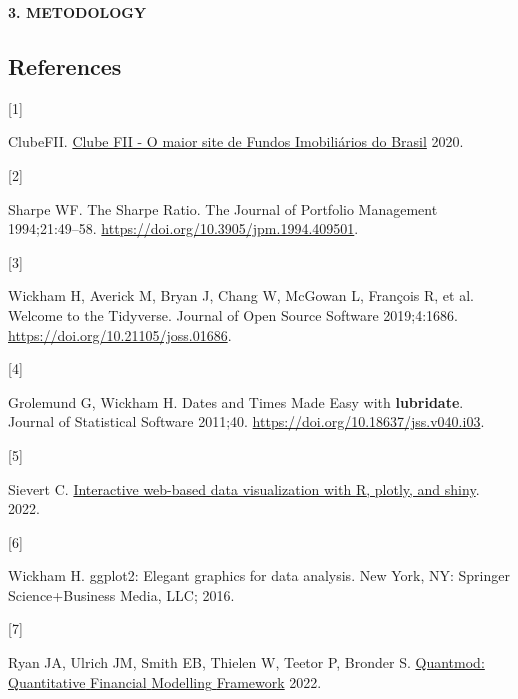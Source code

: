 \documentclass[
]{article}
\newlength{\cslhangindent}
\newlength{\csllabelwidth}
\newlength{\cslentryspacingunit} %
\newenvironment{CSLReferences}[2] %
 {%
  \setlength{\parindent}{0pt}
  \ifodd #1
  \let\oldpar\par
  \def\par{\hangindent=\cslhangindent\oldpar}
  \fi
  \setlength{\parskip}{#2\cslentryspacingunit}
 }%
 {}
\newcommand{\CSLLeftMargin}[1]{\parbox[t]{\csllabelwidth}{#1}}
\newcommand{\CSLRightInline}[1]{\parbox[t]{\linewidth - \csllabelwidth}{#1}\break}
\begin{document}
\begin{center}
\textbf{3. METODOLOGY}
\end{center}

\hypertarget{references}{%
\subsection*{References}\label{references}}

\hypertarget{refs}{}
\begin{CSLReferences}{0}{0}
\leavevmode{}%
\CSLLeftMargin{{[}1{]} }%
\CSLRightInline{ClubeFII. \href{https://www.clubefii.com.br}{Clube FII -
O maior site de Fundos Imobiliários do Brasil} 2020.}

\leavevmode{}%
\CSLLeftMargin{{[}2{]} }%
\CSLRightInline{Sharpe WF. The Sharpe Ratio. The Journal of Portfolio
Management 1994;21:49--58.
\url{https://doi.org/10.3905/jpm.1994.409501}.}

\leavevmode{}%
\CSLLeftMargin{{[}3{]} }%
\CSLRightInline{Wickham H, Averick M, Bryan J, Chang W, McGowan L,
François R, et al. Welcome to the {Tidyverse}. Journal of Open Source
Software 2019;4:1686. \url{https://doi.org/10.21105/joss.01686}.}

\leavevmode{}%
\CSLLeftMargin{{[}4{]} }%
\CSLRightInline{Grolemund G, Wickham H. Dates and {Times} {Made} {Easy}
with \textbf{lubridate}. Journal of Statistical Software 2011;40.
\url{https://doi.org/10.18637/jss.v040.i03}.}

\leavevmode{}%
\CSLLeftMargin{{[}5{]} }%
\CSLRightInline{Sievert C. \href{https://plotly-r.com/}{Interactive
web-based data visualization with {R}, plotly, and shiny}. 2022.}

\leavevmode{}%
\CSLLeftMargin{{[}6{]} }%
\CSLRightInline{Wickham H. ggplot2: Elegant graphics for data analysis.
New York, NY: Springer Science+Business Media, LLC; 2016.}

\leavevmode{}%
\CSLLeftMargin{{[}7{]} }%
\CSLRightInline{Ryan JA, Ulrich JM, Smith EB, Thielen W, Teetor P,
Bronder S. \href{https://CRAN.R-project.org/package=quantmod}{Quantmod:
{Quantitative} {Financial} {Modelling} {Framework}} 2022.}


\end{CSLReferences}
\end{document}
